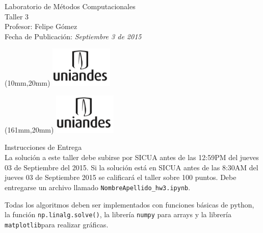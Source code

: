 \documentclass[11pt,letterpaper]{exam}
\begin{document}
\begin{center}
{\Large Laboratorio de Métodos Computacionales} \\
Taller 3 \\
Profesor: Felipe G\'omez\\
Fecha de Publicación: {\small \it Septiembre 3 de 2015}\\
\end{center}

\begin{textblock*}{40mm}(10mm,20mm)
  \includegraphics[width=3cm]{logoUniandes.png}
\end{textblock*}

\begin{textblock*}{40mm}(161mm,20mm)
  \includegraphics[width=3cm]{logoUniandes.png}
\end{textblock*}

\vspace{0.5cm}

{\Large Instrucciones de Entrega}\\

\noindent
La solución a este taller debe subirse por SICUA antes de las 12:59PM
del jueves 03 de Septiembre del 2015. 
\noindent
Si la soluci\'on est\'a en SICUA
antes de las 8:30AM del jueves 03 de Septiembre 2015 se calificar\'a
el taller sobre 100 puntos. 
\noindent
Debe entregarse un archivo llamado \verb"NombreApellido_hw3.ipynb".

\par

Todas los algoritmos deben ser implementados con funciones b\'asicas
de python, la función \verb"np.linalg.solve()", la librería \verb"numpy"
para arrays y la librería \verb"matplotlib"para realizar gráficas.
\end{document}
